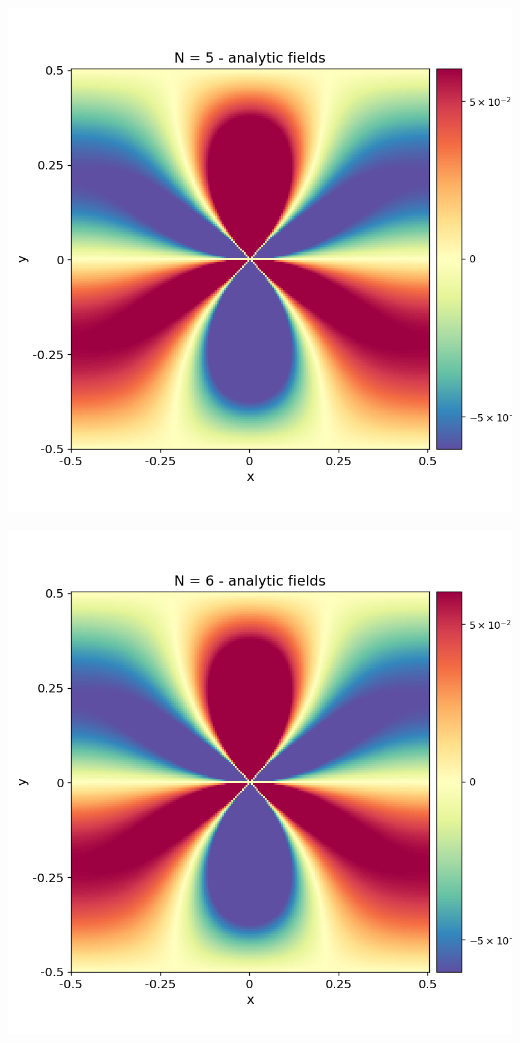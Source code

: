 \documentclass[12pt,a4paper]{article}
\theoremstyle{plain}
\begin{document}
\begin{minipage}{0.24\textwidth}
	\centering
	\includegraphics[width=\textwidth]{../stress_field_05.png}
\end{minipage}
\begin{minipage}{0.24\textwidth}
	\centering
	\includegraphics[width=\textwidth]{../stress_field_06.png}
\end{minipage}	
\end{document}
